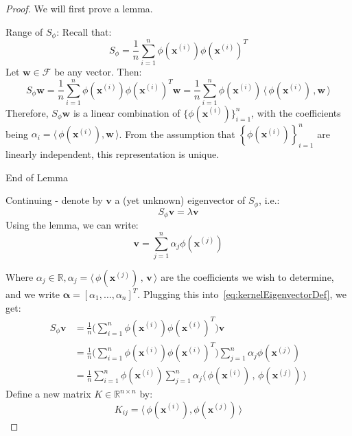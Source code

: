 \documentclass{article}
\begin{document}
\begin{theorem} \hphantom{}

  \noindent{} 

\begin{proof}
We will first prove a lemma.
\begin{lemma}{Range of $S_{\phi}$}:  Recall that:
\[
  S_{\phi} = \frac{1}{n} \sum_{i=1}^{n} \phi(\bm{x}^{(i)}) \phi(\bm{x}^{(i)})^T
\]
Let $\bm{w} \in \mathcal{F}$ be any vector. Then:
\[
S_{\phi} \bm{w} = \frac{1}{n} \sum_{i=1}^{n} \phi(\bm{x}^{(i)}) \phi(\bm{x}^{(i)})^T \bm{w} = \frac{1}{n} \sum_{i=1}^{n} \phi(\bm{x}^{(i)}) \, \langle \, \phi(\bm{x}^{(i)}) \,, \bm{w} \, \rangle
\]
Therefore, $S_{\phi} \bm{w}$ is a linear combination of $\{  \phi(\bm{x}^{(i)}) \}_{i=1}^{n}$, with the coefficients being  $\alpha_i= \langle \, \phi(\bm{x}^{(i)}), \bm{w} \, \rangle$. 
From the assumption that $\left\{  \phi(\bm{x}^{(i)}) \right\}_{i=1}^{n}$ are linearly independent, this representation is unique. 

End of Lemma
\end{lemma}

Continuing - denote by $\bm{v}$ a (yet unknown) eigenvector of $S_{\phi}$, i.e.:
\begin{equation} \label{eq:kernelEigenvectorDef}
  S_{\phi} \bm{v} = \lambda \bm{v}
\end{equation}
Using the lemma, we can write:
  \begin{equation} 
  \bm{v} = \sum_{j=1}^{n} \alpha_{j} \phi(\bm{x}^{(j)})
\end{equation}

Where $\alpha_j  \in \mathbb{R}, \alpha_j = \langle \, \phi(\bm{x}^{(j)}) \,, \, \bm{v} \, \rangle$ are the coefficients we wish to determine, and we write $\bm{\alpha}=[\alpha_{1}, \ldots, \alpha_n]^T$.  Plugging this into~\cref{eq:kernelEigenvectorDef}, we get:
\begin{align*}
  S_{\phi} \bm{v} &= \frac{1}{n} \Big( \sum_{i=1}^{n} \phi(\bm{x}^{(i)}) \phi(\bm{x}^{(i)})^T \Big)  \bm{v} \\
  &= \frac{1}{n} \Big( \sum_{i=1}^{n} \phi(\bm{x}^{(i)}) \phi(\bm{x}^{(i)})^T \Big)  \sum_{j=1}^{n} \alpha_j \phi(\bm{x}^{(j)})  \\
  &= \frac{1}{n} \sum_{i=1}^{n} \phi(\bm{x}^{(i)}) \sum_{j=1}^{n} \alpha_{j} \langle \, \phi(\bm{x}^{(i)}) \,, \, \phi(\bm{x}^{(j)}) \, \rangle
\end{align*}
Define a new matrix $K \in \mathbb{R}^{n \times  n}$ by:
\[
  K_{ij} = \langle \, \phi(\bm{x}^{(i)}), \phi(\bm{x}^{(j)}) \, \rangle
\]


\end{proof}
\end{theorem}
\end{document}
